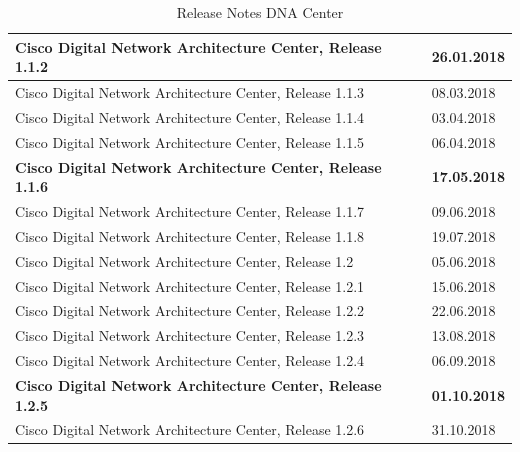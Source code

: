 \begin{table}[H]
	\centering
	\begin{tabularx}{\textwidth}{X | l}
		Cisco Digital Network Architecture Center, Release 1.1.2      & 26.01.2018        \\
		\hline
		Cisco Digital Network Architecture Center, Release 1.1.3      & 08.03.2018        \\
		\hline
		Cisco Digital Network Architecture Center, Release 1.1.4      & 03.04.2018        \\
		\hline
		Cisco Digital Network Architecture Center, Release 1.1.5      & 06.04.2018        \\
		\hline
		\textbf{Cisco Digital Network Architecture Center, Release 1.1.6}      & \textbf{17.05.2018}        \\
		\hline
		Cisco Digital Network Architecture Center, Release 1.1.7      & 09.06.2018        \\
		\hline
		Cisco Digital Network Architecture Center, Release 1.1.8      & 19.07.2018        \\
		\hline
		Cisco Digital Network Architecture Center, Release 1.2        & 05.06.2018        \\
		\hline
		Cisco Digital Network Architecture Center, Release 1.2.1      & 15.06.2018        \\
		\hline
		Cisco Digital Network Architecture Center, Release 1.2.2      & 22.06.2018        \\
		\hline
		Cisco Digital Network Architecture Center, Release 1.2.3      & 13.08.2018        \\
		\hline
		Cisco Digital Network Architecture Center, Release 1.2.4      & 06.09.2018        \\
		\hline
		\textbf{Cisco Digital Network Architecture Center, Release 1.2.5}      & \textbf{01.10.2018}        \\
		\hline
		Cisco Digital Network Architecture Center, Release 1.2.6      & 31.10.2018        
	\end{tabularx}
	\caption{Release Notes DNA Center \cite{dnac-releasenotes}}
	\label{tab:Release Notes DNA Center}
\end{table}




